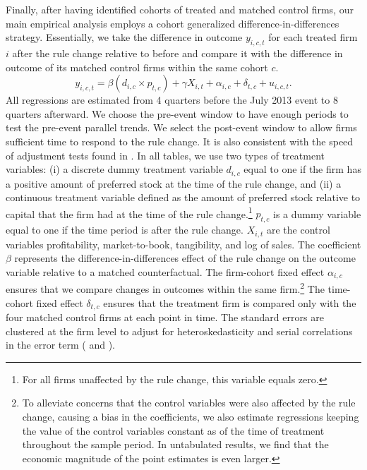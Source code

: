 \documentclass[a4paper, 12pt]{article}
\begin{document}
Finally, after having identified cohorts of treated and matched control firms, our main empirical analysis employs a cohort generalized difference-in-differences strategy. Essentially, we take the difference in outcome $y_{i,c,t}$ for each treated firm $i$ after the rule change relative to before and compare it with the difference in outcome of its matched control firms within the same cohort $c$.
	\begin{equation} \label{eq:single}
	y_{i,c,t}= \beta (d_{i,c} \times p_{t,c}) +  \gamma X_{i,t} + \alpha_{i,c} + \delta_{t,c} + u_{i,c,t}.
	\end{equation}
All regressions are estimated from 4 quarters before the July 2013 event to 8 quarters afterward. We choose the pre-event window to have enough periods to test the pre-event parallel trends. We select the post-event window to allow firms sufficient time to respond to the rule change. It is also consistent with the speed of adjustment tests found in \cite{leary2005firms}. In all tables, we use two types of treatment variables: (i) a discrete dummy treatment variable $d_{i,c}$ equal to one if the firm has a positive amount of preferred stock at the time of the rule change, and (ii) a continuous treatment variable defined as the amount of preferred stock relative to capital that the firm had at the time of the rule change.\footnote{For all firms unaffected by the rule change, this variable equals zero.} $p_{t,c}$ is a dummy variable equal to one if the time period is after the rule change. $X_{i,t}$ are the control variables profitability, market-to-book, tangibility, and log of sales. The coefficient $\beta$ represents the difference-in-differences effect of the rule change on the outcome variable relative to a matched counterfactual. The firm-cohort fixed effect $\alpha_{i,c}$ ensures that we compare changes in outcomes within the same firm.\footnote{To alleviate concerns that the control variables were also affected by the rule change, causing a bias in the coefficients, we also estimate regressions keeping the value of the control variables constant as of the time of treatment throughout the sample period. In untabulated results, we find that the economic magnitude of the point estimates is even larger.} The time-cohort fixed effect $\delta_{t,c}$ ensures that the treatment firm is compared only with the four matched control firms at each point in time. The standard errors are clustered at the firm level to adjust for heteroskedasticity and serial correlations in the error term (\citealp{petersen2009estimating} and \citealp{thompson2011simple}).
\end{document}
